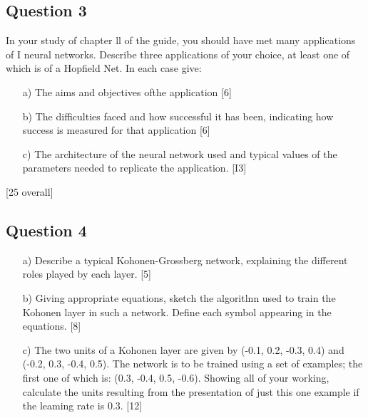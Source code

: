 \documentclass[a4paper,11pt]{report}
\begin{document}
\subsection{Question 3}
In your study of chapter ll of the guide, you should have met many applications of I
neural networks.
Describe three applications of your choice, at least one of which is of a Hopfield Net. In
each case give:
\begin{itemize}
\item[a)] The aims and objectives ofthe application
[6]
\item[b)] The difficulties faced and how successful it has been, indicating how success is
measured for that application
[6]
\item[c)] The architecture of the neural network used and typical values of the parameters
needed to replicate the application.
[I3]
\end{itemize}
[25 overall]
\subsection{Question 4}
\begin{itemize}
\item[a)] Describe a typical Kohonen-Grossberg network, explaining the different roles played
by each layer.
[5]
\item[b)]  Giving appropriate equations, sketch the algoritlnn used to train the Kohonen layer in
such a network. Define each symbol appearing in the equations.
[8]
\item[c)] The two units of a Kohonen layer are given by (-0.1, 0.2, -0.3, 0.4) and (-0.2, 0.3,
-0.4, 0.5). The network is to be trained using a set of examples; the first one of which is:
(0.3, -0.4, 0.5, -0.6). Showing all of your working, calculate the units resulting from the
presentation of just this one example if the leaming rate is 0.3.
[12]
\end{itemize}

\end{document}
